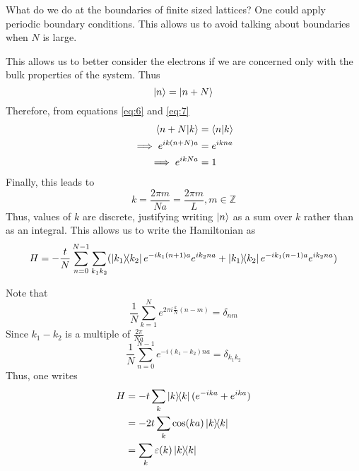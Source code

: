 \documentclass[12pt,a4paper,titlepage]{article}
\begin{document}
What do we do at the boundaries of finite sized lattices? One could apply periodic boundary conditions. This allows us to avoid talking about boundaries when $N$ is large.\\
\begin{center}
\end{center}
This allows us to better consider the electrons if we are concerned only with the bulk properties of the system. Thus
\begin{equation}\label{eq:7}
\ket{n}=\ket{n+N}
\end{equation}
Therefore, from equations \eqref{eq:6} and \eqref{eq:7}
\begin{equation}
\begin{aligned}
\braket{n+N}{k}&=\braket{n}{k}\\
\implies e^{ik(n+N)a}&=e^{ikna}\\
\implies e^{ikNa}&=1
\end{aligned}
\end{equation}
Finally, this leads to
\begin{equation}
k=\frac{2\pi m}{Na}=\frac{2\pi m}{L}, m \in \mathbb{Z}
\end{equation}
Thus, values of $k$ are discrete, justifying writing $\ket{n}$ as a sum over $k$ rather than as an integral. This allows us to write the Hamiltonian as
\begin{equation}
H=-\frac{t}{N}\sum_{n=0}^{N-1}\sum_{k_{1}k_{2}}(\ketbra{k_{1}}{k_{2}}e^{-ik_{1}(n+1)a}e^{ik_{2}na}+\ketbra{k_{1}}{k_{2}}e^{-ik_{1}(n-1)a}e^{ik_{2}na})
\end{equation}

Note that
\begin{equation}
\frac{1}{N}\sum_{k=1}^{N}e^{2\pi i\frac{k}{N}(n-m)}=\delta_{nm}
\end{equation}
Since $k_{1}-k_{2}$ is a multiple of $\frac{2\pi}{Na}$
\begin{equation}
\frac{1}{N}\sum_{n=0}^{N-1}e^{-i(k_{1}-k_{2})na}=\delta_{k_{1}k_{2}}
\end{equation}
Thus, one writes
\begin{equation}
\begin{aligned}
H&=-t\sum_{k}\ketbra{k}{k}(e^{-ika}+e^{ika})\\
&=-2t\sum_{k}\cos(ka)\ketbra{k}{k}\\
&=\sum_{k}\varepsilon(k)\ketbra{k}
\end{aligned}
\end{equation}
\end{document}
